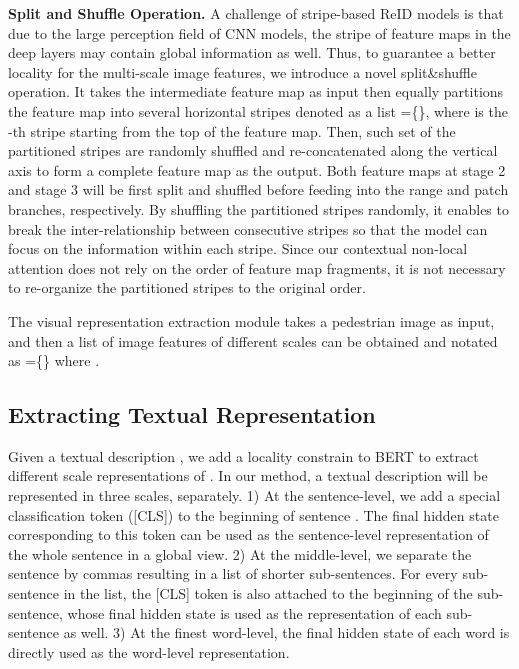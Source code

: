 \documentclass[final]{cvpr}
\begin{document}
\textbf{Split and Shuffle Operation.} A challenge of stripe-based ReID models is that due to the large perception field of CNN models, the stripe of feature maps in the deep layers may contain global information as well. 
Thus, to guarantee a better locality for the multi-scale image features, we introduce a novel split\&shuffle operation.  
It takes the intermediate feature map as input then equally partitions the feature map into several horizontal stripes denoted as a list =\{\}, where  is the -th stripe starting from the top of the feature map.  
Then, such set of the partitioned stripes are randomly shuffled and re-concatenated along the vertical axis to form a complete feature map as the output. 
Both feature maps at stage 2 and stage 3 will be first split and shuffled before feeding into the range and patch branches, respectively. 
By shuffling the partitioned stripes randomly, it enables to break the inter-relationship between consecutive stripes so that the model can focus on the information within each stripe. 
Since our contextual non-local attention does not rely on the order of feature map fragments, it is not necessary to re-organize the partitioned stripes to the original order. 




The visual representation extraction module takes a pedestrian image as input, and then a list of image features of different scales can be obtained and notated as =\{\} where   .


\subsection{Extracting Textual Representation}
Given a textual description , we add a locality constrain to BERT to extract different scale representations of . 
In our method, a textual description will be represented in three scales, separately. 
1) At the sentence-level, we add a special classification token ([CLS]) to the beginning of sentence . The final hidden state corresponding to this token can be used as the sentence-level representation of the whole sentence  in a global view. 
2) At the middle-level, we separate the sentence  by commas resulting in a list of shorter sub-sentences. For every sub-sentence in the list, the [CLS] token is also attached to the beginning of the sub-sentence, whose final hidden state is used as the representation of each sub-sentence as well. 
3) At the finest word-level, the final hidden state of each word is directly used as the word-level representation.
\end{document}
